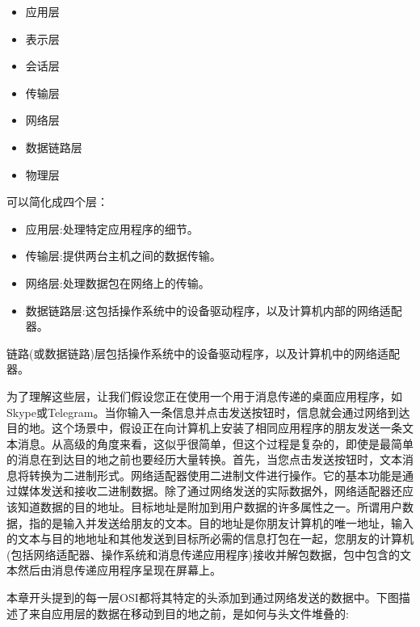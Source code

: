 \begin{itemize}
	\item 应用层
	\item 表示层
	\item 会话层
	\item 传输层
	\item 网络层
	\item 数据链路层
	\item 物理层
\end{itemize}

可以简化成四个层： \par

\begin{itemize}
	\item 应用层:处理特定应用程序的细节。
	\item 传输层:提供两台主机之间的数据传输。
	\item 网络层:处理数据包在网络上的传输。
	\item 数据链路层:这包括操作系统中的设备驱动程序，以及计算机内部的网络适配器。
\end{itemize}

链路(或数据链路)层包括操作系统中的设备驱动程序，以及计算机中的网络适配器。 \par
为了理解这些层，让我们假设您正在使用一个用于消息传递的桌面应用程序，如Skype或Telegram。当你输入一条信息并点击发送按钮时，信息就会通过网络到达目的地。这个场景中，假设正在向计算机上安装了相同应用程序的朋友发送一条文本消息。从高级的角度来看，这似乎很简单，但这个过程是复杂的，即使是最简单的消息在到达目的地之前也要经历大量转换。首先，当您点击发送按钮时，文本消息将转换为二进制形式。网络适配器使用二进制文件进行操作。它的基本功能是通过媒体发送和接收二进制数据。除了通过网络发送的实际数据外，网络适配器还应该知道数据的目的地址。目标地址是附加到用户数据的许多属性之一。所谓用户数据，指的是输入并发送给朋友的文本。目的地址是你朋友计算机的唯一地址，输入的文本与目的地地址和其他发送到目标所必需的信息打包在一起，您朋友的计算机(包括网络适配器、操作系统和消息传递应用程序)接收并解包数据，包中包含的文本然后由消息传递应用程序呈现在屏幕上。 \par
本章开头提到的每一层OSI都将其特定的头添加到通过网络发送的数据中。下图描述了来自应用层的数据在移动到目的地之前，是如何与头文件堆叠的: \par

